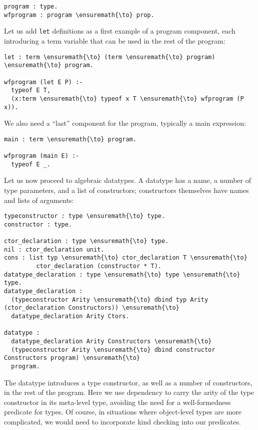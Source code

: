 \begin{verbatim}
program : type.
wfprogram : program \ensuremath{\to} prop.
\end{verbatim}

Let us add \texttt{let} definitions as a first example of a program
component, each introducing a term variable that can be used in the rest
of the program:

\begin{verbatim}
let : term \ensuremath{\to} (term \ensuremath{\to} program) \ensuremath{\to} program.

wfprogram (let E P) :-
  typeof E T,
  (x:term \ensuremath{\to} typeof x T \ensuremath{\to} wfprogram (P x)).
\end{verbatim}

We also need a ``last'' component for the program, typically a main
expression:

\begin{verbatim}
main : term \ensuremath{\to} program.

wfprogram (main E) :-
  typeof E _.
\end{verbatim}

Let us now proceed to algebraic datatypes. A datatype has a name, a
number of type parameters, and a list of constructors; constructors
themselves have names and lists of arguments:

\begin{verbatim}
typeconstructor : type \ensuremath{\to} type.
constructor : type.

ctor_declaration : type \ensuremath{\to} type.
nil : ctor_declaration unit.
cons : list typ \ensuremath{\to} ctor_declaration T \ensuremath{\to}
         ctor_declaration (constructor * T).
datatype_declaration : type \ensuremath{\to} type \ensuremath{\to} type.
datatype_declaration : 
  (typeconstructor Arity \ensuremath{\to} dbind typ Arity (ctor_declaration Constructors)) \ensuremath{\to}
  datatype_declaration Arity Ctors.

datatype :
  datatype_declaration Arity Constructors \ensuremath{\to}
  (typeconstructor Arity \ensuremath{\to} dbind constructor Constructors program) \ensuremath{\to}
  program.
\end{verbatim}

The datatype introduces a type constructor, as well as a number of
constructors, in the rest of the program. Here we use dependency to
carry the arity of the type constructor in its meta-level type, avoiding
the need for a well-formedness predicate for types. Of course, in
situations where object-level types are more complicated, we would need
to incorporate kind checking into our predicates.

